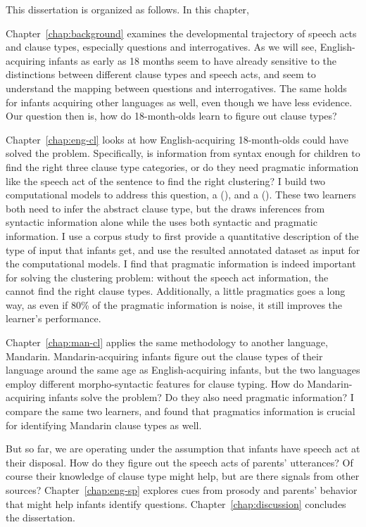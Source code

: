 This dissertation is organized as follows. In this chapter, 

Chapter~\ref{chap:background} examines the developmental trajectory of speech acts and clause types, especially questions and interrogatives. As we will see, English-acquiring infants as early as 18 months seem to have already sensitive to the distinctions between different clause types and speech acts, and seem to understand the mapping between questions and interrogatives. The same holds for infants acquiring other languages as well, even though we have less evidence. Our question then is, how do 18-month-olds learn to figure out clause types?

Chapter~\ref{chap:eng-cl} looks at how English-acquiring 18-month-olds could have solved the problem. Specifically, is information from syntax enough for children to find the right three clause type categories, or do they need pragmatic information like the speech act of the sentence to find the right clustering? I build two computational models to address this question, a \distlearner{} (\dlearnerabbr{}), and a \praglearner{} (\plearnerabbr{}). These two learners both need to infer the abstract clause type, but the \dlearnerabbr{} draws inferences from syntactic information alone while the \plearnerabbr{} uses both syntactic and pragmatic information. I use a corpus study to first provide a quantitative description of the type of input that infants get, and use the resulted annotated dataset as input for the computational models. I find that pragmatic information is indeed important for solving the clustering problem: without the speech act information, the \dlearnerabbr{} cannot find the right clause types. Additionally, a little pragmatics goes a long way, as  even if 80\% of the pragmatic information is noise, it still improves the learner's performance. 

Chapter~\ref{chap:man-cl} applies the same methodology to another language, Mandarin. Mandarin-acquiring infants figure out the clause types of their language around the same age as English-acquiring infants, but the two languages employ different morpho-syntactic features for clause typing. How do Mandarin-acquiring infants solve the problem? Do they also need pragmatic information? I compare the same two learners, and found that pragmatics information is crucial for identifying Mandarin clause types as well.

But so far, we are operating under the assumption that infants have speech act at their disposal. How do they figure out the speech acts of parents' utterances? Of course their knowledge of clause type might help, but are there signals from other sources? Chapter~\ref{chap:eng-sp} explores cues from prosody and parents' behavior that might help infants identify questions. Chapter~\ref{chap:discussion} concludes the dissertation.
 
